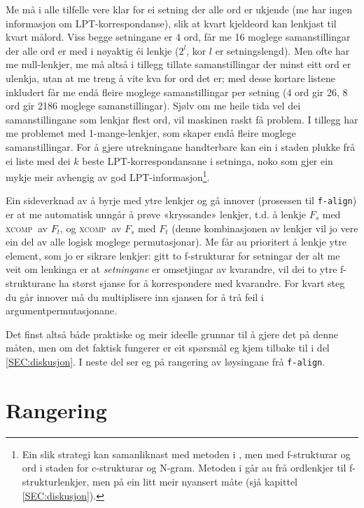 \documentclass[12pt,a4paper,oneside,draft]{report}
\newcommand{\F}[2]{\textsc{#1}\ensuremath{_{#2}}}
\newcommand{\XCOMPs}{\F{xcomp~}{}}
\begin{document}
Me må i alle tilfelle vere klar for ei setning der alle ord er ukjende
 (me har ingen informasjon om LPT\hyp{}korrespondanse), slik at kvart
 kjeldeord kan lenkjast til kvart målord. Viss begge setningane er 4
 ord, får me 16 moglege samanstillingar der alle ord er med i nøyaktig
 éi lenkje ($2^l$, kor $l$ er setningslengd). Men ofte har me
 null-lenkjer, me må altså i tillegg tillate samanstillingar der minst
 eitt ord er ulenkja, utan at me treng å vite kva for ord det er; med
 desse kortare listene inkludert får me endå fleire moglege
 samanstillingar per setning (4 ord gir 26, 8 ord gir 2186 moglege
 samanstillingar). Sjølv om me heile tida vel dei samanstillingane som
 lenkjar flest ord, vil maskinen raskt få problem. I tillegg har me
 problemet med 1-mange-lenkjer, som skaper endå fleire moglege
 samanstillingar. For å gjere utrekningane handterbare kan ein i
 staden plukke frå ei liste med dei $k$ beste LPT\hyp{}korrespondansane i
 setninga, noko som gjer ein mykje meir avhengig av god
 LPT\hyp{}informasjon\footnote{Ein slik strategi kan samanliknast med metoden i
        \citet{samuelsson2007apa}, men med f\hyp{}strukturar og ord i
        staden for c\hyp{}strukturar og N-gram. Metoden i
        \citet{graham2009osr} går au frå ordlenkjer til
        f-strukturlenkjer, men på ein litt meir nyansert måte (sjå
        kapittel \ref{SEC:diskusjon}). }.

Ein sideverknad av å byrje med ytre lenkjer og gå innover (prosessen
 til \texttt{f-align}) er at me automatisk unngår å prøve «kryssande»
 lenkjer, t.d. å lenkje $F_s$ med \XCOMPs av $F_t$, og \XCOMPs av
 $F_s$ med $F_t$ (denne kombinasjonen av lenkjer vil jo vere ein del
 av alle logisk moglege permutasjonar). Me får au prioritert å lenkje
 ytre element, som jo er sikrare lenkjer: gitt to f\hyp{}strukturar
 for setningar der alt me veit om lenkinga er at \emph{setningane} er
 omsetjingar av kvarandre, vil dei to ytre f\hyp{}strukturane ha
 størst sjanse for å korrespondere med kvarandre. For kvart steg du
 går innover må du multiplisere inn sjansen for å trå feil i
 argumentpermutasjonane.

Det finst altså både praktiske og meir ideelle grunnar til å gjere det
 på denne måten, men om det faktisk fungerer er eit spørsmål eg kjem
 tilbake til i del \ref{SEC:diskusjon}. I neste del ser eg på
 rangering av løysingane frå \texttt{f-align}.

\section{Rangering}
\label{sec-4.2}
\end{document}
